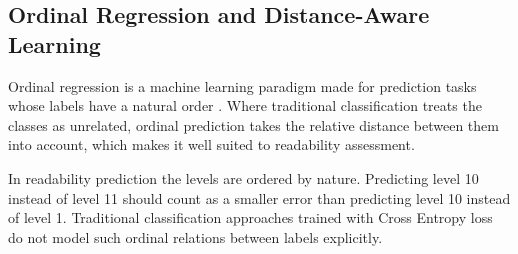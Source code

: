 \subsection{Ordinal Regression and Distance-Aware Learning}

Ordinal regression is a machine learning paradigm made for prediction tasks whose labels have a natural order \cite{gutierrez2016ordinal}. Where traditional classification treats the classes as unrelated, ordinal prediction takes the relative distance between them into account, which makes it well suited to readability assessment.

In readability prediction the levels are ordered by nature. Predicting level 10 instead of level 11 should count as a smaller error than predicting level 10 instead of level 1. Traditional classification approaches trained with Cross Entropy loss do not model such ordinal relations between labels explicitly.

